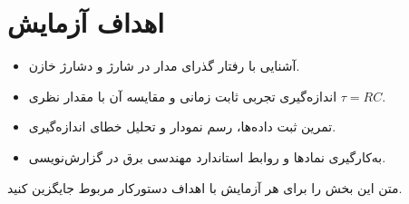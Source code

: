 \section{اهداف آزمایش}

\begin{itemize}
  \item آشنایی با رفتار گذرای مدار  در شارژ و دشارژ خازن.
  \item اندازه‌گیری تجربی ثابت زمانی و مقایسه آن با مقدار نظری $\tau=RC$.
  \item تمرین ثبت داده‌ها، رسم نمودار و تحلیل خطای اندازه‌گیری.
  \item به‌کارگیری نمادها و روابط استاندارد مهندسی برق در گزارش‌نویسی.
\end{itemize}

متن این بخش را برای هر آزمایش با اهداف دستورکار مربوط جایگزین کنید.
